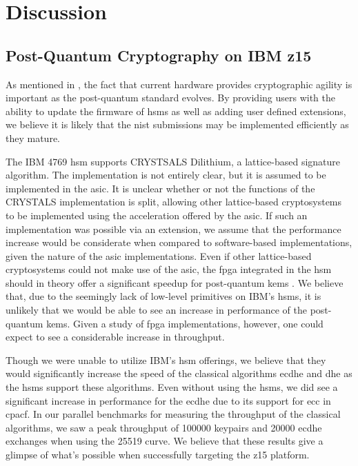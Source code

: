 \chapter{Discussion}
\label{chapter:discussion}

\section{Post-Quantum Cryptography on IBM z15}

As mentioned in \cite{microsoft2020, ibm:z15:2019}, the fact that current hardware provides cryptographic agility is important as the \gls{post-quantum} standard evolves. By providing users with the ability to update the firmware of \glspl{hsm} as well as adding user defined extensions, we believe it is likely that the \gls{nist} submissions may be implemented efficiently as they mature. 

The IBM 4769 \gls{hsm} supports CRYSTSALS Dilithium, a lattice-based signature algorithm. The implementation is not entirely clear, but it is assumed to be implemented in the \gls{asic}. It is unclear whether or not the functions of the CRYSTALS implementation is split, allowing other lattice-based cryptosystems to be implemented using the acceleration offered by the \gls{asic}. If such an implementation was possible via an extension, we assume that the performance increase would be considerate when compared to software-based implementations, given the nature of the \gls{asic} implementations. Even if other lattice-based cryptosystems could not make use of the \gls{asic}, the \gls{fpga} integrated in the \gls{hsm} should in theory offer a significant speedup for \gls{post-quantum} \glspl{kem} \cite{zhu2021, roy2020}. We believe that, due to the seemingly lack of low-level primitives on IBM's \glspl{hsm}, it is unlikely that we would be able to see an increase in performance of the \gls{post-quantum} \glspl{kem}. Given a study of \gls{fpga} implementations, however, one could expect to see a considerable increase in throughput.

Though we were unable to utilize IBM's \gls{hsm} offerings, we believe that they would significantly increase the speed of the classical algorithms \gls{ecdhe} and \gls{dhe} as the \glspl{hsm} support these algorithms. Even without using the \glspl{hsm}, we did see a significant increase in performance for the \gls{ecdhe} due to its support for \gls{ecc} in \gls{cpacf}. In our parallel benchmarks for measuring the throughput of the classical algorithms, we saw a peak throughput of 100000 keypairs and 20000 \gls{ecdhe} exchanges when using the 25519 curve. We believe that these results give a glimpse of what's possible when successfully targeting the \gls{z15} platform. 

